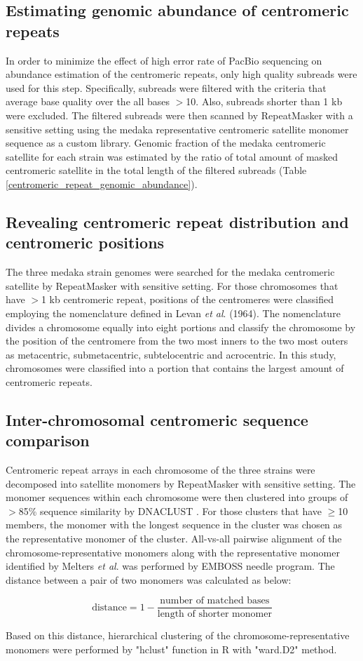 \subsection*{Estimating genomic abundance of centromeric repeats}
In order to minimize the effect of high error rate of PacBio sequencing on abundance estimation of the centromeric repeats, only high quality subreads were used for this step. Specifically, subreads were filtered with the criteria that average base quality over the all bases $>$10. Also, subreads shorter than 1 kb were excluded. The filtered subreads were then scanned by RepeatMasker with a sensitive setting using the medaka representative centromeric satellite monomer sequence as a custom library. Genomic fraction of the medaka centromeric satellite for each strain was estimated by the ratio of total amount of masked centromeric satellite in the total length of the filtered subreads (Table \ref{centromeric_repeat_genomic_abundance}).

\subsection*{Revealing centromeric repeat distribution and centromeric positions}
The three medaka strain genomes were searched for the medaka centromeric satellite by RepeatMasker with sensitive setting. For those chromosomes that have $>$1 kb centromeric repeat, positions of the centromeres were classified employing the nomenclature defined in Levan \textit{et al}. (1964). The nomenclature divides a chromosome equally into eight portions and classify the chromosome by the position of the centromere from the two most inners to the two most outers as metacentric, submetacentric, subtelocentric and acrocentric. In this study, chromosomes were classified into a portion that contains the largest amount of centromeric repeats.

\subsection*{Inter-chromosomal centromeric sequence comparison}
Centromeric repeat arrays in each chromosome of the three strains were decomposed into satellite monomers by RepeatMasker with sensitive setting. The monomer sequences within each chromosome were then clustered into groups of $>$85\% sequence similarity by DNACLUST \cite{}. For those clusters that have $\geq$10 members, the monomer with the longest sequence in the cluster was chosen as the representative monomer of the cluster. All-vs-all pairwise alignment of the chromosome-representative monomers along with the representative monomer identified by Melters \textit{et al}. was performed by EMBOSS needle program. The distance between a pair of two monomers was calculated as below:

\[
  \mbox{distance} = 1 - \frac{\mbox{number of matched bases}}{\mbox{length of shorter monomer}}
\]

Based on this distance, hierarchical clustering of the chromosome-representative monomers were performed by "hclust" function in R with "ward.D2" method.

